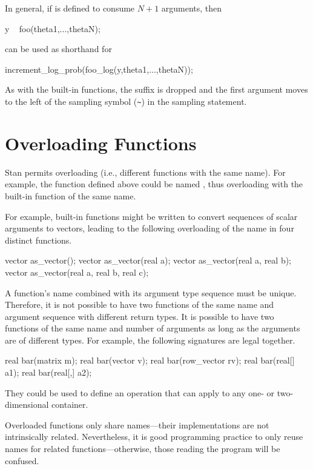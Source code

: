 In general, if  is defined to consume $N + 1$ arguments,
then
%
\begin{stancode}
y ~ foo(theta1,...,thetaN);
\end{stancode}
%
can be used as shorthand for 
%
\begin{stancode}
increment_log_prob(foo_log(y,theta1,...,thetaN));
\end{stancode}
%
As with the built-in functions, the suffix  is dropped and
the first argument moves to the left of the sampling symbol (\Verb|~|)
in the sampling statement.


\section{Overloading Functions}

Stan permits overloading (i.e., different functions with the same
name).  For example, the function  defined above
could be named , thus overloading with the built-in
function of the same name.

For example, built-in functions might be written to convert sequences
of scalar arguments to vectors, leading to the following overloading
of the name  in four distinct functions.
%
\begin{stancode}
vector as_vector();
vector as_vector(real a);
vector as_vector(real a, real b);
vector as_vector(real a, real b, real c);
\end{stancode}

A function's name combined with its argument type sequence must be
unique.  Therefore, it is not possible to have two functions of the
same name and argument sequence with different return types.  It is
possible to have two functions of the same name and number of
arguments as long as the arguments are of different types.  For
example, the following signatures are legal together.
%
\begin{stancode}
real bar(matrix m);
real bar(vector v);
real bar(row_vector rv);
real bar(real[] a1);
real bar(real[,] a2);
\end{stancode}
%
They could be used to define an operation that can apply to any one-
or two-dimensional container.

Overloaded functions only share names---their implementations are not
intrinsically related.  Nevertheless, it is good programming practice
to only reuse names for related functions---otherwise, those reading
the program will be confused.


